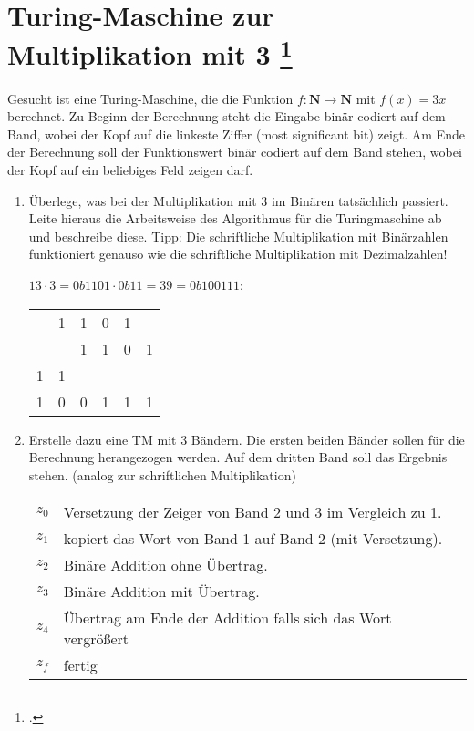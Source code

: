 \documentclass{lehramt-informatik-aufgabe}
\begin{document}
\section{Turing-Maschine zur Multiplikation mit 3
\footcite[Aufgabe 5]{theo:ab:3}}

Gesucht ist eine Turing-Maschine, die die Funktion $f : \mathbf{N}
\rightarrow \mathbf{N}$ mit $f(x) = 3x$ berechnet. Zu Beginn der
Berechnung steht die Eingabe binär codiert auf dem Band, wobei der Kopf
auf die linkeste Ziffer (most significant bit) zeigt. Am Ende der
Berechnung soll der Funktionswert binär codiert auf dem Band stehen,
wobei der Kopf auf ein beliebiges Feld zeigen darf.

\begin{enumerate}


\item Überlege, was bei der Multiplikation mit 3 im Binären tatsächlich
passiert. Leite hieraus die Arbeitsweise des Algorithmus für die
Turingmaschine ab und beschreibe diese. Tipp: Die schriftliche
Multiplikation mit Binärzahlen funktioniert genauso wie die schriftliche
Multiplikation mit Dezimalzahlen!

\begin{liAntwort}
$13 \cdot 3 = 0b1101 \cdot 0b11 = 39 = 0b100111$:

\begin{center}
\begin{tabular}{llllll}
  & 1 & 1 & 0 & 1 &   \\
  &   & 1 & 1 & 0 & 1 \\
{\tiny 1} & {\tiny 1} &   &   &   &   \\\hline
1 & 0 & 0 & 1 & 1 & 1
\end{tabular}
\end{center}
\end{liAntwort}


\item Erstelle dazu eine TM mit 3 Bändern. Die ersten beiden Bänder
sollen für die Berechnung herangezogen werden. Auf dem dritten Band soll
das Ergebnis stehen. (analog zur schriftlichen Multiplikation)

\begin{liAntwort}
\begin{tabular}{ll}
$z_0$ & Versetzung der Zeiger von Band 2 und 3 im Vergleich zu 1. \\
$z_1$ & kopiert das Wort von Band 1 auf Band 2 (mit Versetzung). \\
$z_2$ & Binäre Addition ohne Übertrag. \\
$z_3$ & Binäre Addition mit Übertrag. \\
$z_4$ & Übertrag am Ende der Addition falls sich das Wort vergrößert \\
$z_f$ & fertig \\
\end{tabular}


\end{liAntwort}
\end{enumerate}
\end{document}
